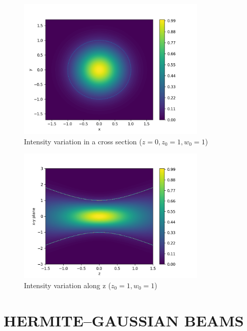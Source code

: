 \documentclass[11pt,a4paper]{article}
\begin{document}
\begin{figure}[H]
	\centering
	\includegraphics[width=9cm]{intensity.png}
	\caption{Intensity variation in a cross section ($z=0,z_0=1,w_0=1$)}
	\label{fig:intensity}
\end{figure}





\begin{figure}[H]
	\centering
	\includegraphics[width=9cm]{intensity_var.png}
	\caption{Intensity variation along z ($z_0=1,w_0=1$)}
	\label{fig:intensity_var}
\end{figure}
\clearpage


\section{HERMITE–GAUSSIAN BEAMS}
\end{document}
